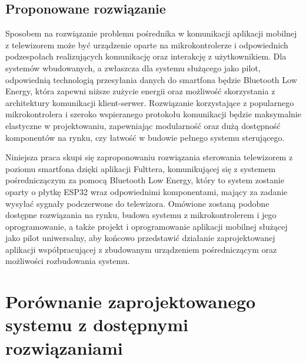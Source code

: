 \documentclass[12pt,twoside]{article}
\begin{document}
\subsection{Proponowane rozwiązanie}
{Sposobem na rozwiązanie problemu pośrednika w komunikacji aplikacji mobilnej z telewizorem
może być urządzenie oparte na mikrokontrolerze i odpowiednich podzespołach 
realizujących komunikację oraz interakcję z użytkownikiem. Dla systemów wbudowanych, a zwłaszcza
dla systemu służącego jako pilot, odpowiednią technologią przesyłania danych do smartfona będzie Bluetooth Low Energy,
która zapewni niższe zużycie energii oraz możliwość skorzystania z architektury komunikacji klient-serwer.
Rozwiązanie korzystające z popularnego mikrokontrolera i szeroko wspieranego protokołu komunikacji 
będzie maksymalnie elastyczne w projektowaniu, zapewniając modularność
oraz dużą dostępność komponentów na rynku, czy łatwość w budowie pełnego systemu sterującego.

Niniejsza praca skupi się zaproponowaniu rozwiązania sterowania telewizorem z poziomu 
smartfona dzięki aplikacji Fulttera, komunikującej się z systemem pośredniczączym za pomocą 
Bluetooth Low Energy, który to system zostanie oparty o płytkę ESP32 wraz odpowiednimi komponentami,
mający za zadanie wysyłać sygnały podczerwone do telewizora. 
Omówione zostaną podobne dostępne rozwiązania na rynku, budowa systemu z
 mikrokontrolerem i jego oprogramowanie, a także projekt i oprogramowanie aplikacji
mobilnej służącej jako pilot uniwersalny, aby końcowo przedstawić działanie zaprojektowanej 
aplikacji współpracującej z zbudowanym urządzeniem pośredniczącym oraz możliwości rozbudowania systemu.}

\clearpage
\section{Porównanie zaprojektowanego systemu z dostępnymi rozwiązaniami}
\end{document}
